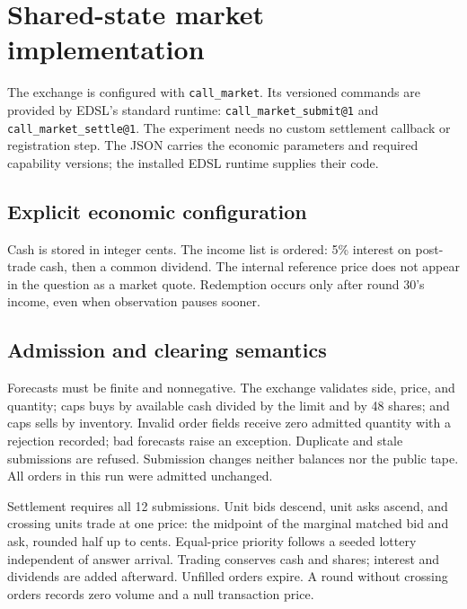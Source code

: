 \documentclass[11pt,letterpaper]{article}
\newcommand{\code}[1]{\texttt{\small #1}}
\begin{document}
\Needspace{0.25\textheight}
\section{Shared-state market implementation}\label{app:state}
The exchange is configured with \code{call\_market}. Its versioned commands
are provided by EDSL's standard runtime: \code{call\_market\_submit@1} and
\code{call\_market\_settle@1}. The experiment needs no custom settlement
callback or registration step. The JSON carries the economic parameters and
required capability versions; the installed EDSL runtime supplies their code.

\par\noindent
\begin{minipage}{\linewidth}
\subsection{Explicit economic configuration}
\WalkMarket
\end{minipage}
\par

Cash is stored in integer cents. The income list is ordered: 5\% interest
on post-trade cash, then a common dividend. The internal reference price does
not appear in the question as a market quote. Redemption occurs only after
round 30's income, even when observation pauses sooner.

\subsection{Admission and clearing semantics}
Forecasts must be finite and nonnegative. The exchange validates side, price,
and quantity; caps buys by available cash divided by the limit and by 48 shares;
and caps sells by inventory. Invalid order fields receive zero admitted
quantity with a rejection recorded; bad forecasts raise an exception.
Duplicate and stale submissions are refused. Submission changes neither
balances nor the public tape. All orders in this run were admitted unchanged.

Settlement requires all 12 submissions. Unit bids descend, unit asks ascend,
and crossing units trade at one price: the midpoint of the marginal matched
bid and ask, rounded half up to cents. Equal-price priority follows a seeded
lottery independent of answer arrival. Trading conserves cash and shares;
interest and dividends are added afterward. Unfilled orders expire. A round
without crossing orders records zero volume and a null transaction price.
\end{document}
